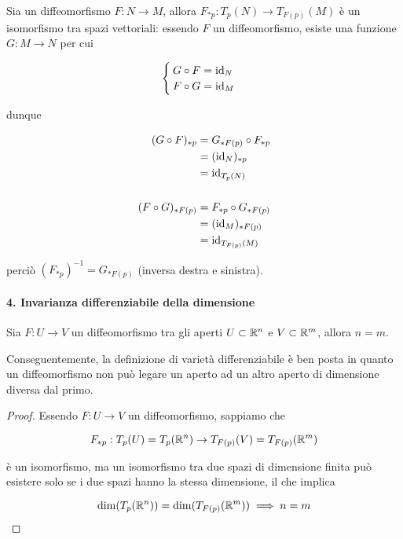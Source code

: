 Sia un diffeomorfismo $ F : N \to M $, allora $ F_{*p} : T_{p}(N) \to T_{F(p)}(M) $ è un isomorfismo tra spazi vettoriali: essendo $ F $ un diffeomorfismo, esiste una funzione $ G : M \to N $ per cui

\begin{equation}
	\begin{cases}
		G \circ F = \operatorname{id}_{N}\\
		F \circ G = \operatorname{id}_{M}
	\end{cases}
\end{equation}

dunque
	
\begin{align}
	\begin{split}
		(G \circ F)_{*p} &= G_{*F(p)} \circ F_{*p}\\
		&= (\operatorname{id}_{N})_{*p}\\
		&= \operatorname{id}_{T_{p}(N)}\\\\
		(F \circ G)_{*F(p)} &= F_{*p} \circ G_{*F(p)}\\
		&= (\operatorname{id}_{M})_{*F(p)}\\
		&= \operatorname{id}_{T_{F(p)}(M)}
	\end{split}
\end{align}

perciò $ (F_{*p})^{-1} = G_{*F(p)} $ (inversa destra e sinistra).

\paragraph{4. Invarianza differenziabile della dimensione}

\begin{theorem}
	Sia $ F : U \to V $ un diffeomorfismo tra gli aperti $ U \subset \mathbb{R}^{n} $ e $ V \subset \mathbb{R}^{m} $, allora $ n = m $.
\end{theorem}

Conseguentemente, la definizione di varietà differenziabile è ben posta in quanto un diffeomorfismo non può legare un aperto ad un altro aperto di dimensione diversa dal primo.

\begin{proof}
	Essendo $ F : U \to V $ un diffeomorfismo, sappiamo che
	
	\begin{equation}
		F_{*p} : T_{p}(U) = T_{p}(\mathbb{R}^{n}) \to T_{F(p)}(V) = T_{F(p)}(\mathbb{R}^{m})
	\end{equation}

	è un isomorfismo, ma un isomorfismo tra due spazi di dimensione finita può esistere solo se i due spazi hanno la stessa dimensione, il che implica
	
	\begin{equation}
		\dim(T_{p}(\mathbb{R}^{n})) = \dim(T_{F(p)}(\mathbb{R}^{m})) \implies n = m
	\end{equation}
\end{proof}

